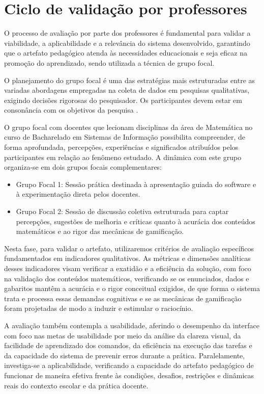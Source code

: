 \section{Ciclo de validação por professores}
O processo de avaliação por parte dos professores é fundamental para validar a
viabilidade, a aplicabilidade e a relevância do sistema desenvolvido, garantindo
que o artefato pedagógico atenda às necessidades educacionais e seja eficaz na
promoção do aprendizado, sendo utilizada a técnica de grupo focal.

O planejamento do grupo focal é uma das
estratégias mais estruturadas entre as variadas abordagens empregadas na coleta
de dados em pesquisas qualitativas, exigindo decisões rigorosas do pesquisador.
Os participantes devem estar em consonância com os objetivos da pesquisa
\cite{gil2021pesquisa}.

O grupo focal com docentes que lecionam disciplinas da área de Matemática no curso de Bacharelado em Sistemas de Informação possibilita compreender, de forma aprofundada, percepções, experiências e significados
atribuídos pelos participantes em relação ao fenômeno estudado. A dinâmica com este grupo organiza-se em dois grupos focais complementares:

\begin{itemize}
    \item Grupo Focal 1: Sessão prática destinada à apresentação guiada do software e à experimentação direta pelos docentes.
    \item Grupo Focal 2: Sessão de discussão coletiva estruturada para captar percepções, sugestões de melhoria e críticas quanto à acurácia dos conteúdos matemáticos e ao rigor das mecânicas de gamificação.
\end{itemize}

Nesta fase, para validar o artefato, utilizaremos
critérios de avaliação específicos fundamentados em indicadores qualitativos. As
métricas e dimensões analíticas desses indicadores visam verificar a exatidão e
a eficiência da solução, com foco na validação dos conteúdos matemáticos,
verificando se os enunciados, dados e gabaritos mantêm a acurácia e o rigor conceitual exigidos, de que forma o sistema trata e processa essas demandas cognitivas e se as mecânicas de gamificação foram projetadas de modo a induzir e estimular
o raciocínio. 

A  avaliação também contempla a usabilidade, aferindo o desempenho da interface com foco nas metas de usabilidade por meio da análise da clareza visual, da facilidade de aprendizado dos comandos, da eficiência na execução das tarefas e da capacidade do sistema de prevenir erros durante a prática. Paralelamente, investiga-se a aplicabilidade, verificando a capacidade do artefato pedagógico de funcionar de maneira efetiva frente às condições, desafios, restrições e dinâmicas reais do contexto escolar e da prática docente.

